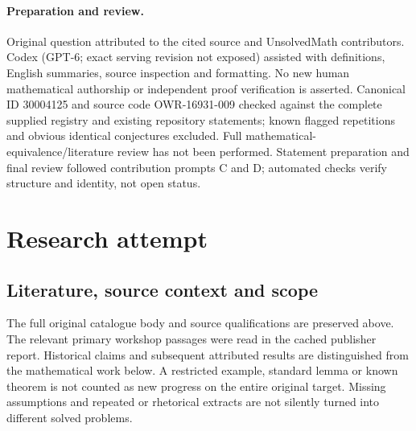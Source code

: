 \documentclass[11pt]{article}
\begin{document}
\paragraph{Preparation and review.}
Original question attributed to the cited source and UnsolvedMath contributors. Codex (GPT-6; exact serving revision not exposed) assisted with definitions, English summaries, source inspection and formatting. No new human mathematical authorship or independent proof verification is asserted. Canonical ID 30004125 and source code OWR-16931-009 checked against the complete supplied registry and existing repository statements; known flagged repetitions and obvious identical conjectures excluded. Full mathematical-equivalence/literature review has not been performed. Statement preparation and final review followed contribution prompts C and D; automated checks verify structure and identity, not open status.
\label{end:30004125}

\section{Research attempt}
\subsection{Literature, source context and scope}
The full original catalogue body and source qualifications are preserved above. The relevant primary workshop passages were read in the cached publisher report. Historical claims and subsequent attributed results are distinguished from the mathematical work below. A restricted example, standard lemma or known theorem is not counted as new progress on the entire original target. Missing assumptions and repeated or rhetorical extracts are not silently turned into different solved problems.
\end{document}
